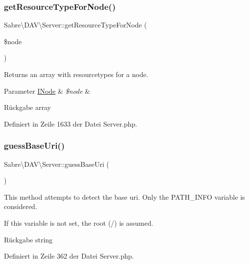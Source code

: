\subsubsection{\texorpdfstring{get\+Resource\+Type\+For\+Node()}{getResourceTypeForNode()}}
{\footnotesize\ttfamily Sabre\textbackslash{}\+D\+A\+V\textbackslash{}\+Server\+::get\+Resource\+Type\+For\+Node (\begin{DoxyParamCaption}\item[{\mbox{\hyperlink{interface_sabre_1_1_d_a_v_1_1_i_node}{I\+Node}}}]{\$node }\end{DoxyParamCaption})}

Returns an array with resourcetypes for a node.


\begin{DoxyParams}[1]{Parameter}
\mbox{\hyperlink{interface_sabre_1_1_d_a_v_1_1_i_node}{I\+Node}} & {\em \$node} & \\
\hline
\end{DoxyParams}
\begin{DoxyReturn}{Rückgabe}
array 
\end{DoxyReturn}


Definiert in Zeile 1633 der Datei Server.\+php.

\mbox{\label{class_sabre_1_1_d_a_v_1_1_server_a62cd0c7c754e18281146dfd025d1e5be}} 
\subsubsection{\texorpdfstring{guess\+Base\+Uri()}{guessBaseUri()}}
{\footnotesize\ttfamily Sabre\textbackslash{}\+D\+A\+V\textbackslash{}\+Server\+::guess\+Base\+Uri (\begin{DoxyParamCaption}{ }\end{DoxyParamCaption})}

This method attempts to detect the base uri. Only the P\+A\+T\+H\+\_\+\+I\+N\+FO variable is considered.

If this variable is not set, the root (/) is assumed.

\begin{DoxyReturn}{Rückgabe}
string 
\end{DoxyReturn}


Definiert in Zeile 362 der Datei Server.\+php.

